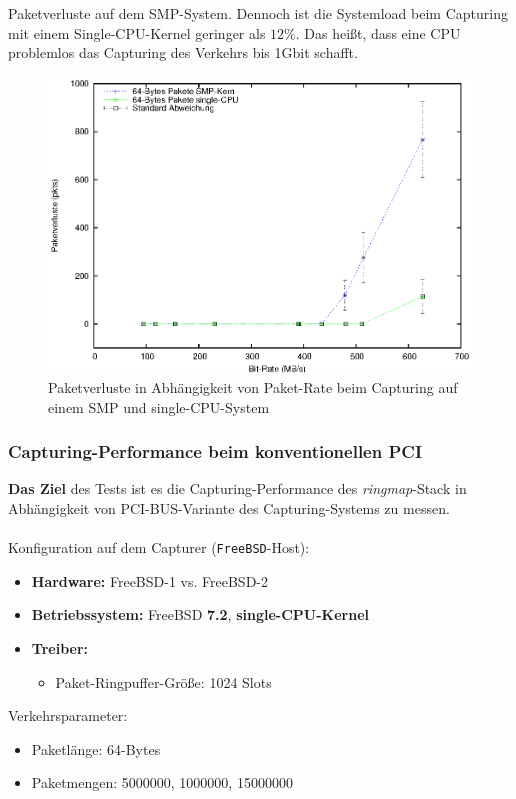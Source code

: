 Paketverluste auf dem SMP-System.  Dennoch ist die Systemload beim Capturing
mit einem Single-CPU-Kernel geringer als $12\%$. Das heißt, dass eine CPU
problemlos das Capturing des Verkehrs bis 1Gbit schafft.
\begin{figure} 
\centering \includegraphics[width=5.5in]{plots/graphs/pktloss_single_vs_SMP_PCIe_mbs}
\caption{Paketverluste in Abhängigkeit von Paket-Rate beim Capturing auf einem SMP und single-CPU-System}
\label{img:plot_pktlos_single_vs_smp_mbs}
\end{figure}

\subsubsection*{Capturing-Performance beim konventionellen PCI}
\textbf{Das Ziel} des Tests ist es die Capturing-Performance des
\emph{ringmap}-Stack in Abhängigkeit von PCI-BUS-Variante des Capturing-Systems
zu messen.\\\\
%
Konfiguration auf dem Capturer (\verb+FreeBSD+-Host): 
\begin{itemize}
	\item \textbf{Hardware:} FreeBSD-1 vs. FreeBSD-2 
	\item \textbf{Betriebssystem:} FreeBSD \textbf{7.2}, \textbf{single-CPU-Kernel}
	\item \textbf{Treiber:} 
		\begin{itemize}
			\item Paket-Ringpuffer-Größe: 1024 Slots
		\end{itemize}
\end{itemize}
Verkehrsparameter:
\begin{itemize}
	\item Paketlänge: 64-Bytes
	\item Paketmengen: 5000000, 1000000, 15000000
\end{itemize}
